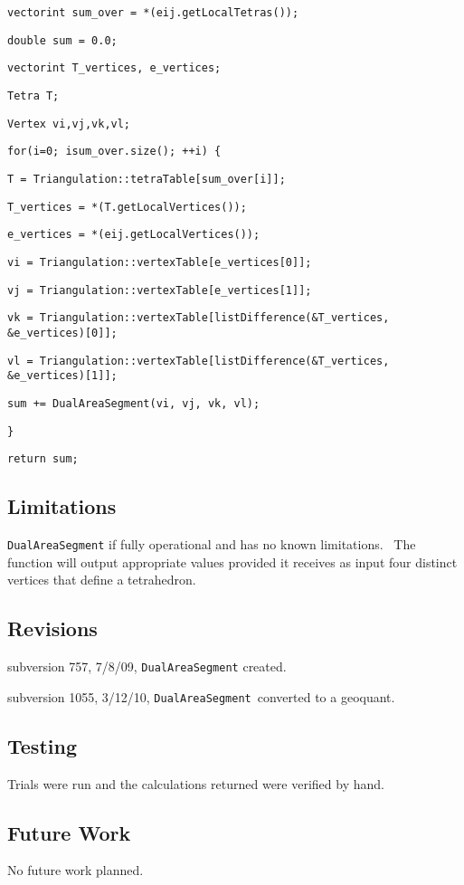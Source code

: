 \bigskip

\texttt{vector\TEXTsymbol{<}int\TEXTsymbol{>} sum\_over =
*(eij.getLocalTetras());}

\texttt{double sum = 0.0;}

\texttt{vector\TEXTsymbol{<}int\TEXTsymbol{>} T\_vertices, e\_vertices;}

\texttt{Tetra T;}

\texttt{Vertex vi,vj,vk,vl;}

\texttt{for(i=0; i\TEXTsymbol{<}sum\_over.size(); ++i) \{}

\qquad\texttt{T = Triangulation::tetraTable[sum\_over[i]];}

\qquad\texttt{T\_vertices = *(T.getLocalVertices());}

\qquad\texttt{e\_vertices = *(eij.getLocalVertices());}

\qquad\texttt{vi = Triangulation::vertexTable[e\_vertices[0]];}

\qquad\texttt{vj = Triangulation::vertexTable[e\_vertices[1]];}

\qquad\texttt{vk = Triangulation::vertexTable[listDifference(\&T\_vertices,
\&e\_vertices)[0]];}

\qquad\texttt{vl = Triangulation::vertexTable[listDifference(\&T\_vertices,
\&e\_vertices)[1]];}

\qquad \texttt{sum += DualAreaSegment(vi, vj, vk, vl);}

\qquad\texttt{\}}

\texttt{return sum;}

\subsection*{Limitations}

\texttt{DualAreaSegment} if fully operational and has no known limitations.
\ The function will output appropriate values provided it receives as input
four distinct vertices that define a tetrahedron.

\subsection*{Revisions}

subversion 757, 7/8/09, \texttt{DualAreaSegment} created.

subversion 1055, 3/12/10, \texttt{DualAreaSegment}\ converted to a geoquant.

\subsection*{Testing}

Trials were run and the calculations returned were verified by hand.

\subsection*{Future Work}

No future work planned.
